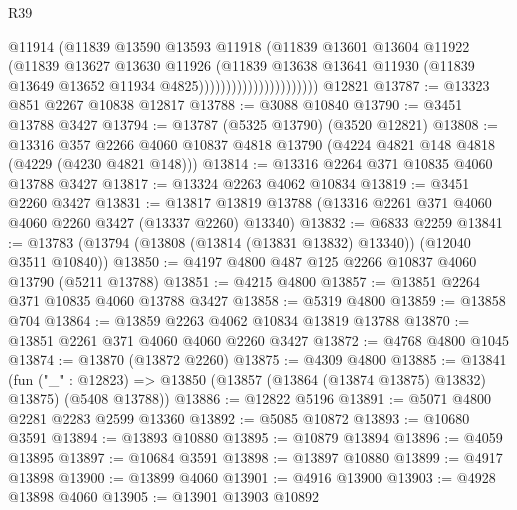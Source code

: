 \begin{lexlean}{R39}
\begin{coremodule}
                                      @11914
                                      (@11839
                                        @13590
                                        @13593
                                        @11918
                                        (@11839
                                          @13601
                                          @13604
                                          @11922
                                          (@11839
                                            @13627
                                            @13630
                                            @11926
                                            (@11839
                                              @13638
                                              @13641
                                              @11930
                                              (@11839
                                                @13649
                                                @13652
                                                @11934
                                                @4825))))))))))))))))))))))
    @12821
@13787 := @13323 @851 @2267 @10838 @12817
@13788 := @3088 @10840
@13790 := @3451 @13788 @3427
@13794 := @13787 (@5325 @13790) (@3520 @12821)
@13808 := @13316
    @357
    @2266
    @4060
    @10837
    @4818
    @13790
    (@4224 @4821 @148 @4818 (@4229 (@4230 @4821 @148)))
@13814 := @13316 @2264 @371 @10835 @4060 @13788 @3427
@13817 := @13324 @2263 @4062 @10834
@13819 := @3451 @2260 @3427
@13831 := @13817 @13819 @13788 (@13316 @2261 @371 @4060 @4060 @2260 @3427 (@13337 @2260) @13340)
@13832 := @6833 @2259
@13841 := @13783 (@13794 (@13808 (@13814 (@13831 @13832) @13340)) (@12040 @3511 @10840))
@13850 := @4197 @4800 @487 @125 @2266 @10837 @4060 @13790 (@5211 @13788)
@13851 := @4215 @4800
@13857 := @13851 @2264 @371 @10835 @4060 @13788 @3427
@13858 := @5319 @4800
@13859 := @13858 @704
@13864 := @13859 @2263 @4062 @10834 @13819 @13788
@13870 := @13851 @2261 @371 @4060 @4060 @2260 @3427
@13872 := @4768 @4800 @1045
@13874 := @13870 (@13872 @2260)
@13875 := @4309 @4800
@13885 := @13841
    (fun ("_" : @12823) => @13850 (@13857 (@13864 (@13874 @13875) @13832) @13875) (@5408 @13788))
@13886 := @12822 @5196
@13891 := @5071 @4800 @2281 @2283 @2599 @13360
@13892 := @5085 @10872
@13893 := @10680 @3591
@13894 := @13893 @10880
@13895 := @10879 @13894
@13896 := @4059 @13895
@13897 := @10684 @3591
@13898 := @13897 @10880
@13899 := @4917 @13898
@13900 := @13899 @4060
@13901 := @4916 @13900
@13903 := @4928 @13898 @4060
@13905 := @13901 @13903 @10892

\end{coremodule}
\end{lexlean}
